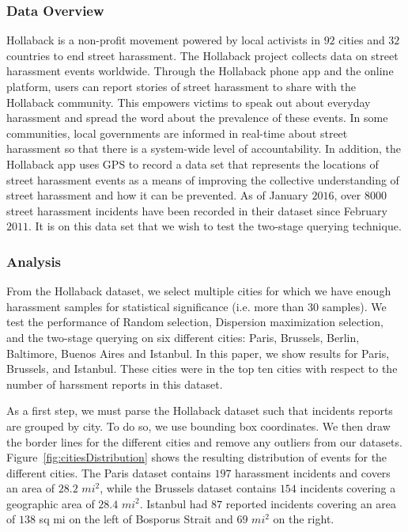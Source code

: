 \documentclass{acm_proc_article-sp}
\begin{document}
\subsubsection{Data Overview}
Hollaback is a non-profit movement powered by local activists in $92$ cities and $32$ countries to end street harassment. The Hollaback project collects data on street harassment events worldwide. Through the Hollaback phone app and the online platform, users can report stories of street harassment to share with the Hollaback community. This empowers victims to speak out about everyday harassment and spread the word about the prevalence of these events. In some communities, local governments are informed in real-time about street harassment so that there is a system-wide level of accountability. In addition, the Hollaback app uses GPS to record a data set that represents the locations of street harassment events as a means of improving the collective understanding of street harassment and how it can be prevented.  As of January $2016$, over $8000$ street harassment incidents have been recorded in their dataset since February $2011$.  It is on this data set that we wish to test the two-stage querying technique.\par
\subsubsection{Analysis}
From the Hollaback dataset, we select multiple cities for which we have enough harassment samples for statistical significance (i.e. more than 30 samples). We test the performance of Random selection, Dispersion maximization selection, and the two-stage querying on six different cities: Paris, Brussels, Berlin, Baltimore, Buenos Aires and Istanbul. In this paper, we show results for Paris, Brussels, and Istanbul. These cities were in the top ten cities with respect to the number of harssment reports in this dataset.\par

As a first step, we must parse the Hollaback dataset such that incidents reports are grouped by city. To do so, we use bounding box coordinates. We then draw the border lines for the different cities and remove any outliers from our datasets. Figure~\ref{fig:citiesDistribution} shows the resulting distribution of events for the different cities. The Paris dataset contains $197$ harassment incidents and covers an area of $28.2$ $mi^2$, while the Brussels dataset contains $154$ incidents covering a geographic area of $28.4$ $mi^2$. Istanbul had $87$ reported incidents covering an area of $138$ sq mi on the left of Bosporus Strait and $69$ $mi^2$ on the right. \par
\end{document}
